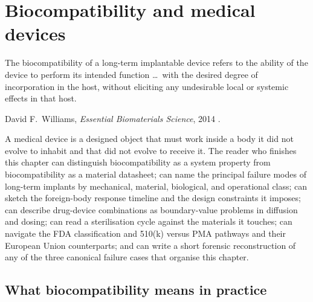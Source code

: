 \chapter{Biocompatibility and medical devices}
\label{vol06:ch12}

\epigraph{The biocompatibility of a long-term implantable device
refers to the ability of the device to perform its intended function
\ldots\ with the desired degree of incorporation in the host,
without eliciting any undesirable local or systemic effects in that
host.}{David F.\ Williams, \emph{Essential Biomaterials Science},
2014 \cite{text:v6c12-williams-biocompatibility-2014}.}


\noindent
A medical device is a designed object that must work inside a body
it did not evolve to inhabit and that did not evolve to receive it.
The reader who finishes this chapter can distinguish biocompatibility
as a system property from biocompatibility as a material datasheet;
can name the principal failure modes of long-term implants by
mechanical, material, biological, and operational class; can sketch
the foreign-body response timeline and the design constraints it
imposes; can describe drug-device combinations as boundary-value
problems in diffusion and dosing; can read a sterilisation cycle
against the materials it touches; can navigate the FDA classification
and 510(k) versus PMA pathways and their European Union counterparts;
and can write a short forensic reconstruction of any of the three
canonical failure cases that organise this chapter.

\section{What biocompatibility means in practice}


